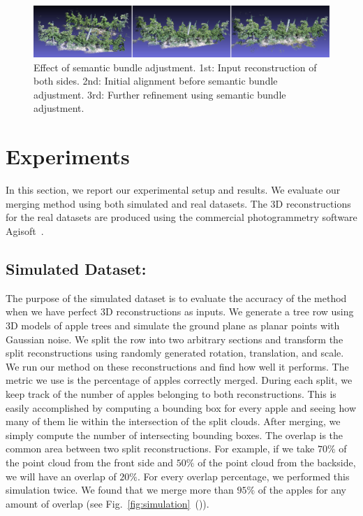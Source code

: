 \begin{figure}[!htbp]
        \centering
            \includegraphics[width =\columnwidth]{figures/merge_both/Canopy_Test.pdf}           
   \caption[Effect of semantic bundle adjustment.]{Effect of semantic bundle adjustment. 1st: Input reconstruction of both sides. 2nd: Initial alignment before semantic bundle adjustment. 3rd: Further refinement using semantic bundle adjustment.}
   \label{fig:Canopy_Test_sba}
\end{figure}


\section{Experiments}\label{sec:expresults}

In this section, we report our experimental setup and results. We evaluate our merging method using both simulated and real datasets. The 3D reconstructions for the real datasets are produced using the commercial photogrammetry software Agisoft~\cite{agisoft}.


\subsection{Simulated Dataset:}
The purpose of the simulated dataset is to evaluate the accuracy of the method when we have perfect 3D reconstructions as inputs. We generate a tree row using 3D models of apple trees and simulate the ground plane as planar points with Gaussian noise. We split the row into two arbitrary sections and transform the split reconstructions using randomly generated rotation, translation, and scale. We run our method on these reconstructions and find how well it performs. The metric we use is the percentage of apples correctly merged. During each split, we keep track of the number of apples belonging to both reconstructions. This is easily accomplished by computing a bounding box for every apple and seeing how many of them lie within the intersection of the split clouds. After merging, we simply compute the number of intersecting bounding boxes. The overlap is the common area between two split reconstructions. For example, if we take $70\%$ of the point cloud from the front side and $50\%$ of the point cloud from the backside, we will have an overlap of $20\%$. For every overlap percentage, we performed this simulation twice. We found that we merge more than $95\%$ of the apples for any amount of overlap (see Fig.~\ref{fig:simulation}~()).

